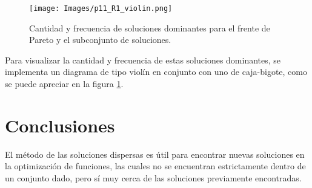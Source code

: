 \documentclass{report}
\begin{document}
\begin{figure}
\centering
    \texttt{[image: Images/p11\_R1\_violin.png]}
    \caption{Cantidad y frecuencia de soluciones dominantes para el frente de Pareto y el subconjunto de soluciones.}
    \label{fig4}
\end{figure}

\newpage

Para visualizar la cantidad y frecuencia de estas soluciones dominantes, se implementa un diagrama de tipo viol\'in en conjunto con uno de caja-bigote, como se puede apreciar en la figura \ref{fig4}.

\section{Conclusiones}

El m\'etodo de las soluciones dispersas es \'util para encontrar nuevas soluciones en la optimizaci\'on de funciones, las cuales no se encuentran estrictamente dentro de un conjunto dado, pero s\'i muy cerca de las soluciones previamente encontradas.



\end{document}
